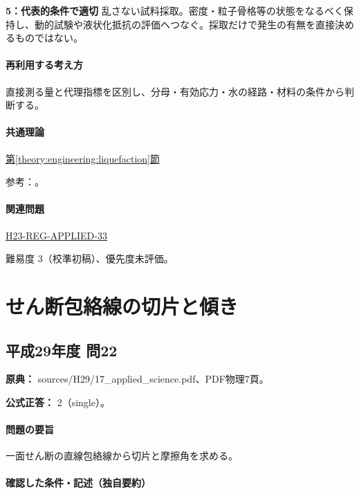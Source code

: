 \noindent\textbf{5：代表的条件で適切} 乱さない試料採取。密度・粒子骨格等の状態をなるべく保持し、動的試験や液状化抵抗の評価へつなぐ。採取だけで発生の有無を直接決めるものではない。\par

\paragraph{再利用する考え方} 直接測る量と代理指標を区別し、分母・有効応力・水の経路・材料の条件から判断する。

\paragraph{共通理論} \hyperref[theory:engineering:liquefaction]{第\ref*{theory:engineering:liquefaction}節}

\par 参考：\cite{eng52_liquefaction,eng52_plate_liq,geebec_ps}。

\paragraph{関連問題} \hyperref[q:h23-reg-applied-33]{H23-REG-APPLIED-33}

\par 難易度 3（校準初稿）、優先度未評価。

\section{せん断包絡線の切片と傾き}

\subsection{平成29年度 問22}
\label{q:h29-reg-applied-22}

\noindent\textbf{原典：} sources/H29/17\_applied\_science.pdf、PDF物理7頁。

\textbf{公式正答：} 2（single）。

\paragraph{問題の要旨} 一面せん断の直線包絡線から切片と摩擦角を求める。

\paragraph{確認した条件・記述（独自要約）}\mbox{}\par

